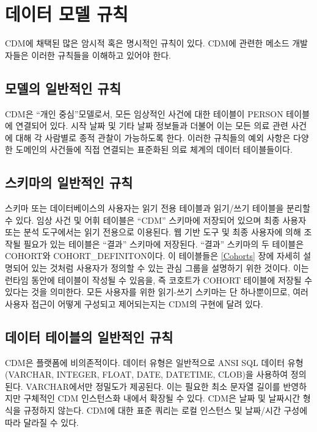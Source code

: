 \documentclass[11pt]{book}
\theoremstyle{definition}
\theoremstyle{definition}
\theoremstyle{definition}
\theoremstyle{remark}
\begin{document}
\section{데이터 모델 규칙}\label{--}

CDM에 채택된 많은 암시적 혹은 명시적인 규칙이 있다. CDM에 관련한 메소드
개발자들은 이러한 규칙들을 이해하고 있어야 한다.

\subsection{모델의 일반적인 규칙}\label{model-Conv}

CDM은 ``개인 중심''모델로서, 모든 임상적인 사건에 대한 테이블이 PERSON
테이블에 연결되어 있다. 시작 날짜 및 기타 날짜 정보들과 더불어 이는 모든
의료 관련 사건에 대해 각 사람별로 종적 관찰이 가능하도록 한다. 이러한
규칙들의 예외 사항은 다양한 도메인의 사건들에 직접 연결되는 표준화된
의료 체계의 데이터 테이블들이다.

\subsection{스키마의 일반적인 규칙}\label{--}

스키마 또는 데이터베이스의 사용자는 읽기 전용 테이블과 읽기/쓰기
테이블을 분리할 수 있다. 임상 사건 및 어휘 테이블은 ``CDM'' 스키마에
저장되어 있으며 최종 사용자 또는 분석 도구에서는 읽기 전용으로 이용된다.
웹 기반 도구 및 최종 사용자에 의해 조작될 필요가 있는 테이블은 ``결과''
스키마에 저장된다. ``결과'' 스키마의 두 테이블은 COHORT와
COHORT\_DEFINITON이다. 이 테이블들은 \ref{Cohorts} 장에 자세히 설명되어
있는 것처럼 사용자가 정의할 수 있는 관심 그룹을 설명하기 위한 것이다.
이는 런타임 동안에 테이블이 작성될 수 있음을, 즉 코호트가 COHORT
테이블에 저장될 수 있다는 것을 의미한다. 모든 사용자를 위한 읽기-쓰기
스키마는 단 하나뿐이므로, 여러 사용자 접근이 어떻게 구성되고
제어되는지는 CDM의 구현에 달려 있다.

\subsection{데이터 테이블의 일반적인 규칙}\label{---}

CDM은 플랫폼에 비의존적이다. 데이터 유형은 일반적으로 ANSI SQL 데이터
유형(VARCHAR, INTEGER, FLOAT, DATE, DATETIME, CLOB)을 사용하여 정의된다.
VARCHAR에서만 정밀도가 제공된다. 이는 필요한 최소 문자열 길이를
반영하지만 구체적인 CDM 인스턴스화 내에서 확장될 수 있다. CDM은 날짜 및
날짜시간 형식을 규정하지 않는다. CDM에 대한 표준 쿼리는 로컬 인스턴스 및
날짜/시간 구성에 따라 달라질 수 있다.
\end{document}
